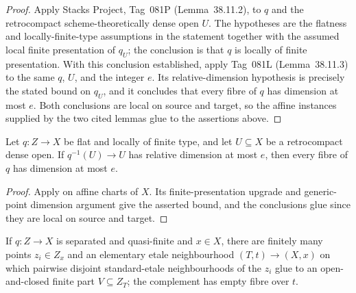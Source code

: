 \begin{proof}
  Apply Stacks Project, Tag~081P (Lemma~38.11.2), to $q$ and the
  retrocompact scheme-theoretically dense open $U$.  The hypotheses are the
  flatness and locally-finite-type assumptions in the statement together with
  the assumed local finite presentation of $q_U$; the conclusion is that $q$
  is locally of finite presentation.  With this conclusion established,
  apply Tag~081L (Lemma~38.11.3) to the same $q$, $U$, and the integer $e$.
  Its relative-dimension hypothesis is precisely the stated bound on
  $q_U$, and it concludes that every fibre of $q$ has dimension at most $e$.
  Both conclusions are local on source and target, so the affine instances
  supplied by the two cited lemmas glue to the assertions above.
\end{proof}

\begin{lemma}
  \label{lemma:nagata-flat-dense-open-relative-dimension}

  Let $q\colon Z\to X$ be flat and locally of finite type, and let
  $U\subseteq X$ be a retrocompact dense open.  If $q^{-1}(U)\to U$ has
  relative dimension at most $e$, then every fibre of $q$ has dimension at
  most $e$.
\end{lemma}

\begin{proof}
  Apply  on affine charts of
  $X$.  Its finite-presentation upgrade and generic-point dimension argument
  give the asserted bound, and the conclusions glue since they are local on
  source and target.
\end{proof}

\begin{lemma}
  \label{lemma:nagata-standard-etale-finite-part-package}

  If $q\colon Z\to X$ is separated and quasi-finite and $x\in X$, there are
  finitely many points $z_i\in Z_x$ and an elementary etale neighbourhood
  $(T,t)\to(X,x)$ on which pairwise disjoint standard-etale neighbourhoods of
  the $z_i$ glue to an open-and-closed finite part $V\subseteq Z_T$; the
  complement has empty fibre over $t$.
\end{lemma}

